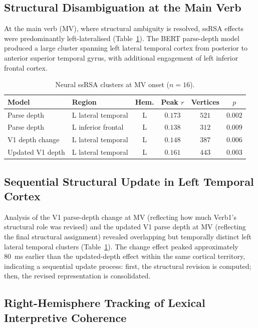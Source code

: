 \documentclass[11pt]{article}
\begin{document}
\subsection{Structural Disambiguation at the Main Verb}

At the main verb (MV), where structural ambiguity is resolved, ssRSA effects were predominantly left-lateralised (Table~\ref{tab:neural_mv}). The BERT parse-depth model produced a large cluster spanning left lateral temporal cortex from posterior to anterior superior temporal gyrus, with additional engagement of left inferior frontal cortex.

\begin{table}[H]
\centering
\caption{Neural ssRSA clusters at MV onset ($n = 16$).}
\label{tab:neural_mv}
\begin{tabular}{llcccc}
\toprule
Model & Region & Hem. & Peak $r$ & Vertices & $p$ \\
\midrule
Parse depth & L lateral temporal & L & $0.173$ & $521$ & $0.002$ \\
Parse depth & L inferior frontal & L & $0.138$ & $312$ & $0.009$ \\
V1 depth change & L lateral temporal & L & $0.148$ & $387$ & $0.006$ \\
Updated V1 depth & L lateral temporal & L & $0.161$ & $443$ & $0.003$ \\
\bottomrule
\end{tabular}
\end{table}

\subsection{Sequential Structural Update in Left Temporal Cortex}

Analysis of the V1 parse-depth change at MV (reflecting how much Verb1's structural role was revised) and the updated V1 parse depth at MV (reflecting the final structural assignment) revealed overlapping but temporally distinct left lateral temporal clusters (Table~\ref{tab:neural_mv}). The change effect peaked approximately 80~ms earlier than the updated-depth effect within the same cortical territory, indicating a sequential update process: first, the structural revision is computed; then, the revised representation is consolidated.

\subsection{Right-Hemisphere Tracking of Lexical Interpretive Coherence}
\end{document}
